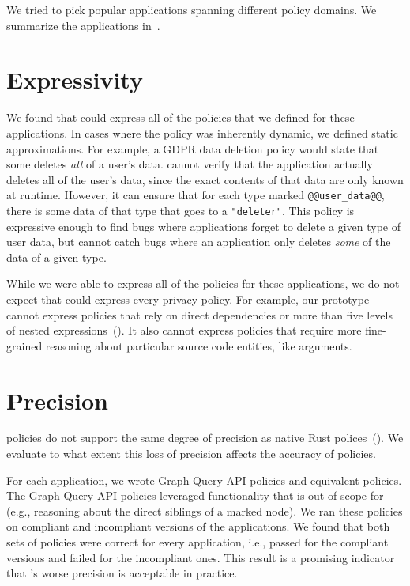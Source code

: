 We tried to pick popular applications spanning different policy domains.
%
We summarize the applications in~.

\section{Expressivity}
\label{sec:expressivity}
%
We found that \syslang{} could express all of the policies that we defined for these applications.
%
In cases where the policy was inherently dynamic, we defined static approximations.
%
For example, a GDPR data deletion policy would state that some \controller{} deletes \emph{all} of a user's data.
%
\sys{} cannot verify that the application actually deletes all of the user's data,
since the exact contents of that data are only known at runtime.
%
However, it can ensure that for each type marked \lstinline[language=CNL]|@@user_data@@|, 
there is some data of that type that goes to a \lstinline[language=CNL]|"deleter"|.
%
This policy is expressive enough to find bugs where applications forget to delete a given type of user data,
but cannot catch bugs where an application only deletes \emph{some} of the data of a given type.
%

While we were able to express all of the policies for these applications,
we do not expect that \syslang{} could express every privacy policy.
%
For example, our \syslang{} prototype cannot express policies that rely on direct dependencies 
or more than five levels of nested expressions~().
%
It also cannot express policies that require more fine-grained reasoning about particular source code
entities, like arguments.
%

\section{Precision}
\label{sec:precision}
\syslang{} policies do not support the same degree of precision as native Rust polices~().
%
We evaluate to what extent this loss of precision affects the accuracy of \syslang{} policies.

For each application, we wrote Graph Query API policies and equivalent \syslang{} policies.
%
The Graph Query API policies leveraged functionality that is out of scope for \syslang{}
(e.g., reasoning about the direct siblings of a marked node).
%
We ran these policies on compliant and incompliant versions of the applications.
%
We found that both sets of policies were correct for every application,
i.e., passed for the compliant versions and failed for the incompliant ones.
%
This result is a promising indicator that \syslang's worse precision is acceptable in practice.

